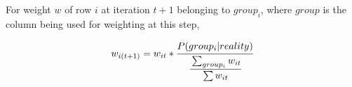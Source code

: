 \documentclass{report}
\begin{document}
For weight $w$ of row $i$ at iteration $t+1$ belonging to $group_i$, where $group$ is the column being used for weighting at this step, 

$$w_{i(t+1)}=w_{it} * \cfrac{P(group_i|reality)}{\cfrac{\sum_{group_i}{w_{it}}}{\sum{w_{it}}}}$$
\end{document}
